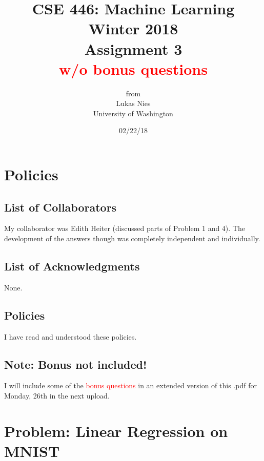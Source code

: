 \documentclass[12pt]{article}
\begin{document}
	
	\title{
		\textbf{\huge{CSE 446: Machine Learning Winter 2018 }} \\[2cm]
		\LARGE{Assignment 3 \\ \textcolor{red}{w/o bonus questions}}\\[1cm]
	}
	\author{from \\ Lukas Nies \\ University of Washington}
	\date{02/22/18}
	\clearpage\maketitle\thispagestyle{empty}
	\newpage

	\tableofcontents
	\setcounter{page}{0}
	\newpage
	
	\setcounter{section}{-1}
	

\section{Policies}

\subsection{List of Collaborators}

My collaborator was Edith Heiter (discussed parts of Problem 1 and 4). The development of the answers though was completely independent and individually.

\subsection{List of Acknowledgments}

None.

\subsection{Policies}

I have read and understood these policies.

\subsection{Note: Bonus not included!}

I will include some of the \textcolor{red}{bonus questions} in an extended version of this .pdf for Monday, 26th in the next upload. 

\newpage

\section{Problem: Linear Regression on MNIST}
\end{document}
